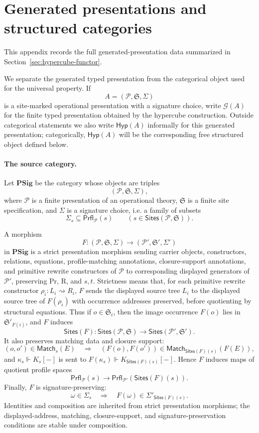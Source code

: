 \documentclass[11pt]{article}
\newcommand{\Proc}{\mathrm{Pr}}
\newcommand{\Rew}{\mathrm{R}}
\newcommand{\rw}{\rightsquigarrow}
\newcommand{\Sites}{\mathsf{Sites}}
\newcommand{\Prfl}{\mathsf{Prfl}}
\newcommand{\Match}{\mathsf{Match}}
\newcommand{\Sig}{\Sigma}
\newcommand{\Hyp}{\mathsf{Hyp}}
\begin{document}
\section{Generated presentations and structured categories}
\label{app:generated-categories}
This appendix records the full generated-presentation data summarized in Section~\ref{sec:hypercube-functor}.

We separate the generated typed presentation from the categorical object used
for the universal property.  If
\[
  A=(\mathcal{P},\mathfrak{S},\Sig)
\]
is a site-marked operational presentation with a signature choice, write
\(\mathcal{G}(A)\) for the finite typed presentation obtained by the
hypercube construction.  Outside categorical statements we also write
\(\Hyp(A)\) informally for this generated presentation; categorically,
\(\Hyp(A)\) will be the corresponding free structured object defined below.

\paragraph{The source category.}
Let \(\mathbf{PSig}\) be the category whose objects are triples
\[
  (\mathcal{P},\mathfrak{S},\Sig),
\]
where \(\mathcal{P}\) is a finite presentation of an operational theory,
\(\mathfrak{S}\) is a finite site specification, and \(\Sig\) is a
signature choice, i.e. a family of subsets
\[
  \Sig_s\subseteq \Prfl_{\mathcal{P}}(s)
  \qquad(s\in\Sites(\mathcal{P},\mathfrak{S})).
\]

A morphism
\[
  F:(\mathcal{P},\mathfrak{S},\Sig)
  \longrightarrow
  (\mathcal{P}',\mathfrak{S}',\Sig')
\]
in \(\mathbf{PSig}\) is a strict presentation morphism sending carrier
objects, constructors, relations, equations, profile-matching annotations,
closure-support annotations, and primitive rewrite constructors of
\(\mathcal{P}\) to corresponding displayed generators of
\(\mathcal{P}'\), preserving \(\Proc\), \(\Rew\), and \(s,t\).  Strictness
means that, for each primitive rewrite constructor \(\rho_i:L_i\rw R_i\),
\(F\) sends the displayed source tree \(L_i\) to the displayed source tree of
\(F(\rho_i)\) with occurrence addresses preserved, before quotienting by
structural equations.  Thus if \(o\in\mathfrak{S}_i\), then the image
occurrence \(F(o)\) lies in \(\mathfrak{S}'_{F(i)}\), and \(F\) induces
\[
  \Sites(F):\Sites(\mathcal{P},\mathfrak{S})
  \longrightarrow
  \Sites(\mathcal{P}',\mathfrak{S}').
\]
It also preserves matching data and closure support:
\[
  (o,o')\in\Match_s(E)
  \quad\Longrightarrow\quad
  (F(o),F(o'))\in\Match_{\Sites(F)(s)}(F(E)),
\]
and \(\kappa_s\Vdash K_s[-]\) is sent to
\(F(\kappa_s)\Vdash K_{\Sites(F)(s)}[-]\).  Hence \(F\) induces maps of
quotient profile spaces
\[
  \Prfl_{\mathcal{P}}(s)
  \longrightarrow
  \Prfl_{\mathcal{P}'}(\Sites(F)(s)).
\]
Finally, \(F\) is signature-preserving:
\[
  \omega\in\Sig_s
  \quad\Longrightarrow\quad
  F(\omega)\in\Sig'_{\Sites(F)(s)}.
\]
Identities and composition are inherited from strict presentation morphisms;
the displayed-address, matching, closure-support, and signature-preservation
conditions are stable under composition.
\end{document}
